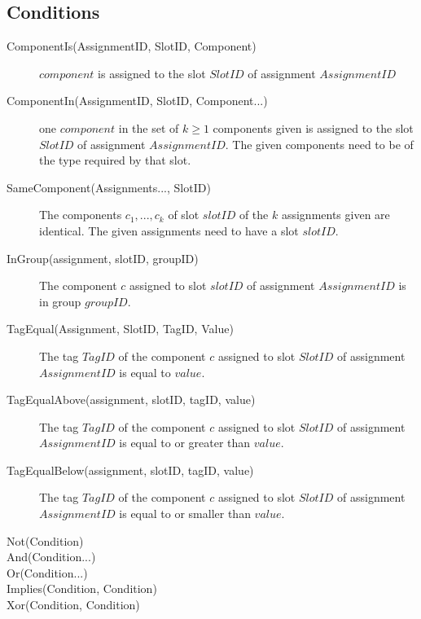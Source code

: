 \subsection{Conditions}
	
\begin{description}
\item[ComponentIs(AssignmentID, SlotID, Component)]
$component$ is assigned to the slot $SlotID$ of assignment $AssignmentID$

\item[ComponentIn(AssignmentID, SlotID, Component...)]	
one $component$ in the set of $k\geq 1$ components given is assigned to the slot $SlotID$ of assignment $AssignmentID$. The given components need to be of the type required by that slot. 

\item[SameComponent(Assignments..., SlotID)]	
The components $c_1,...,c_k$ of slot $slotID$ of the $k$ assignments given are identical. The given assignments need to have a slot $slotID$. 

\item[InGroup(assignment, slotID, groupID)]	
The component $c$ assigned to slot $slotID$ of assignment $AssignmentID$ is in group $groupID$. 
		
\item[TagEqual(Assignment, SlotID, TagID, Value)]	
The tag $TagID$ of the component $c$ assigned to slot $SlotID$ of assignment $AssignmentID$ is equal to $value$. 
	
\item[TagEqualAbove(assignment, slotID, tagID, value)]	
The tag $TagID$ of the component $c$ assigned to slot $SlotID$ of assignment $AssignmentID$ is equal to or greater than $value$. 
	
\item[TagEqualBelow(assignment, slotID, tagID, value)]		
The tag $TagID$ of the component $c$ assigned to slot $SlotID$ of assignment $AssignmentID$ is equal to or smaller than $value$. 
	
\item[Not(Condition)]	
	
	
\item[And(Condition...)]
	

\item[Or(Condition...)]
	

\item[Implies(Condition, Condition)]
	
	
\item[Xor(Condition, Condition)]	
	


\end{description}
